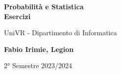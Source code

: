 \begin{titlepage}
	\begin{center}
		\vspace*{1cm}

		\Huge
		\textbf{Probabilità e Statistica\\Esercizi}

		\vspace{0.5cm}
		\LARGE
		UniVR - Dipartimento di Informatica

		\vspace{1.5cm}

		\textbf{Fabio Irimie, Legion}

		\vfill


		\vspace{0.8cm}


		2° Semestre 2023/2024

	\end{center}
\end{titlepage}
